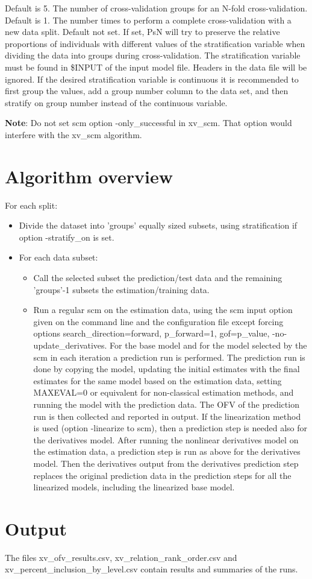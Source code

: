 \begin{optionlist}
Default is 5. The number of cross-validation groups for an N-fold cross-validation. 
\nextopt
{}
Default is 1. The number times to perform a complete cross-validation with a new data split. 
\nextopt
{}
Default not set. If set, PsN will try to preserve the relative proportions of individuals with different values of the stratification variable when dividing the data into groups during cross-validation. The stratification variable must be found in \$INPUT of the input model file. Headers in the data file will be ignored.
If the desired stratification variable is continuous it is recommended to first group the values,
add a group number column to the data set,
and then stratify on group number instead of the continuous variable. 
\nextopt
\end{optionlist}

\textbf{Note}: Do not set scm option -only\_successful in xv\_scm. That option would interfere with the xv\_scm algorithm.

\section{Algorithm overview}
For each split: 
\begin{itemize}
\item[] Divide the dataset into 'groups' equally sized subsets, using stratification if option -stratify\_on is set.
\item[] For each data subset: 
\begin{itemize}
\item[] Call the selected subset the prediction/test data and the remaining 'groups'-1 subsets the estimation/training data. 
\item[] Run a regular scm on the estimation data, using the scm input option given on the command line and the configuration file except forcing options search\_direction=forward, p\_forward=1,  gof=p\_value, -no-update\_derivatives. For the base model and for the model selected by the scm in each iteration a  prediction run is performed. The prediction run is  done by copying the model, updating the initial estimates with the final estimates for the same model based on the estimation data, setting MAXEVAL=0 or equivalent for non-classical estimation methods, and running the model with the prediction data. The OFV of the prediction run is then collected and reported in output.
If the linearization method is used (option -linearize to scm), then a prediction step is needed also for the derivatives model. After running the nonlinear derivatives model on the estimation data, a prediction step is run as above for the derivatives model. Then the derivatives output from the derivatives prediction step replaces the original prediction data in the prediction steps for all the linearized models, including the linearized base model.
\end{itemize}
\end{itemize}
\section{Output}
The files xv\_ofv\_results.csv,  xv\_relation\_rank\_order.csv and xv\_percent\_inclusion\_by\_level.csv contain results and summaries of the runs.



